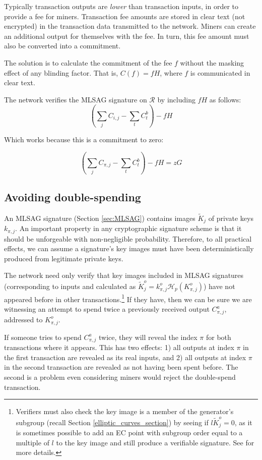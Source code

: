 Typically transaction outputs are {\em lower} than transaction inputs, in order to provide a fee for miners. Transaction fee amounts are stored in clear text (not encrypted) in the transaction data transmitted to the network. Miners can create an additional output for themselves with the fee. In turn, this fee amount must also be converted into a commitment.

The solution is to calculate the commitment of the fee $f$ without the masking effect of any blinding factor. That is, $C(f) = f H$, where $f$ is communicated in clear text.

The network verifies the MLSAG signature on $\mathcal{R}$ by including $f H$ as follows:\\
\[ (\sum\limits_j C_{i, j} - \sum\limits_t C^b_{t}) - f H\]

Which works because this is a commitment to zero:

\[ (\sum\limits_j C_{\pi, j} - \sum\limits_t C^b_{t}) - f H = z G\]

\subsection{Avoiding double-spending}

An MLSAG signature (Section \ref{sec:MLSAG}) contains images \(\tilde{K}_{j}\) of private keys \(k_{\pi, j}\). An important property in any cryptographic signature scheme is that it should be unforgeable with non-negligible probability. Therefore, to all practical effects, we can assume a signature’s key images must have been deterministically produced from legitimate private keys.
	
The network need only verify that key images included in MLSAG signatures (corresponding to inputs and calculated as $\tilde{K}^o_{j} = k^o_{\pi,j} \mathcal{H}_p(K^o_{\pi,j})$) have not appeared before in other transactions.\footnote{Verifiers must also check the key image is a member of the generator's subgroup (recall Section \ref{elliptic_curves_section}) by seeing if $l \tilde{K}^o_{j} = 0$, as it is sometimes possible to add an EC point with subgroup order equal to a multiple of $l$ to the key image and still produce a verifiable signature. See \cite{key-image-bug} for more details.} If they have, then we can be sure we are witnessing an attempt to spend twice a previously received output $C^a_{\pi,j}$, addressed to $K_{\pi,j}^o$.

If someone tries to spend $C^a_{\pi,j}$ twice, they will reveal the index $\pi$ for both transactions where it appears. This has two effects: 1) all outputs at index $\pi$ in the first transaction are revealed as its real inputs, and 2) all outputs at index $\pi$ in the second transaction are revealed as not having been spent before. The second is a problem even considering miners would reject the double-spend transaction.

